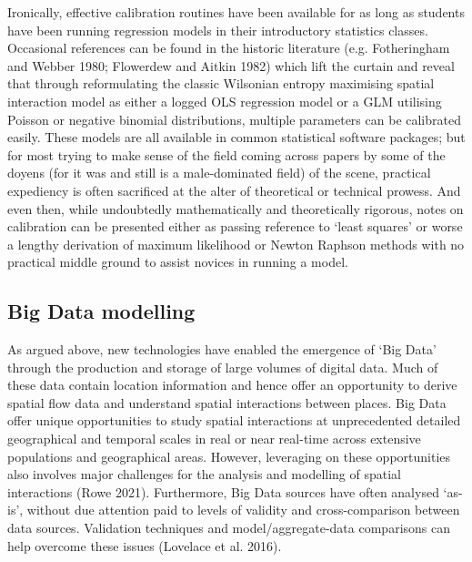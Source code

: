 \documentclass[11pt,letterpaper]{article}
\begin{document}
Ironically, effective calibration routines have been available for as long as students have been running regression models in their introductory statistics classes.
Occasional references can be found in the historic literature (e.g. Fotheringham and Webber 1980; Flowerdew and Aitkin 1982) which lift the curtain and reveal that through reformulating the classic Wilsonian entropy maximising spatial interaction model as either a logged OLS regression model or a GLM utilising Poisson or negative binomial distributions, multiple parameters can be calibrated easily.
These models are all available in common statistical software packages; but for most trying to make sense of the field coming across papers by some of the doyens (for it was and still is a male-dominated field) of the scene, practical expediency is often sacrificed at the alter of theoretical or technical prowess.
And even then, while undoubtedly mathematically and theoretically rigorous, notes on calibration can be presented either as passing reference to `least squares' or worse a lengthy derivation of maximum likelihood or Newton Raphson methods with no practical middle ground to assist novices in running a model.

\hypertarget{big-data-modelling}{%
\subsection{Big Data modelling}\label{big-data-modelling}}

As argued above, new technologies have enabled the emergence of `Big Data' through the production and storage of large volumes of digital data.
Much of these data contain location information and hence offer an opportunity to derive spatial flow data and understand spatial interactions between places.
Big Data offer unique opportunities to study spatial interactions at unprecedented detailed geographical and temporal scales in real or near real-time across extensive populations and geographical areas.
However, leveraging on these opportunities also involves major challenges for the analysis and modelling of spatial interactions (Rowe 2021).
Furthermore, Big Data sources have often analysed `as-is', without due attention paid to levels of validity and cross-comparison between data sources.
Validation techniques and model/aggregate-data comparisons can help overcome these issues (Lovelace et al. 2016).
\end{document}
